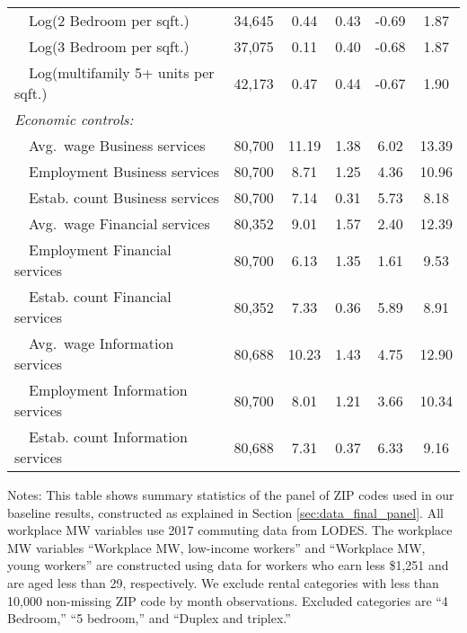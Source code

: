 \begin{table}[hbt!]
\begin{tabular}{@{}lccccc@{}}
        $\quad$Log(2 Bedroom per sqft.)               & 34,645  & 0.44  & 0.43  & -0.69  & 1.87  \\
        $\quad$Log(3 Bedroom per sqft.)               & 37,075  & 0.11  & 0.40  & -0.68  & 1.87  \\
        $\quad$Log(multifamily 5+ units per sqft.)    & 42,173  & 0.47  & 0.44  & -0.67  & 1.90  \\[.3em]
        \textit{Economic controls:}                   &       &       &       &       &       \\
        $\quad$Avg.\ wage Business services           & 80,700  & 11.19  & 1.38  & 6.02  & 13.39  \\
        $\quad$Employment Business services           & 80,700  & 8.71  & 1.25  & 4.36  & 10.96  \\
        $\quad$Estab. count Business services         & 80,700  & 7.14  & 0.31  & 5.73  & 8.18  \\
        $\quad$Avg.\ wage Financial services          & 80,352  & 9.01  & 1.57  & 2.40  & 12.39  \\
        $\quad$Employment Financial services          & 80,700  & 6.13  & 1.35  & 1.61  & 9.53  \\
        $\quad$Estab. count Financial services        & 80,352  & 7.33  & 0.36  & 5.89  & 8.91  \\
        $\quad$Avg.\ wage Information services        & 80,688  & 10.23  & 1.43  & 4.75  & 12.90  \\
        $\quad$Employment Information services        & 80,700  & 8.01  & 1.21  & 3.66  & 10.34  \\
        $\quad$Estab. count Information services      & 80,688  & 7.31  & 0.37  & 6.33  & 9.16  \\ \bottomrule
    \end{tabular}

    \begin{minipage}{.95\textwidth} \footnotesize
        \vspace{2mm}
        Notes: This table shows summary statistics of the panel of ZIP codes 
        used in our baseline results, constructed as explained in Section 
        \ref{sec:data_final_panel}.
        All workplace MW variables use 2017 commuting data from LODES.
        The workplace MW variables ``Workplace MW, low-income workers'' and 
        ``Workplace MW, young workers'' are constructed using data for 
        workers who earn less \$1,251 and are aged less than 29, respectively.
        We exclude rental categories with less than 10,000 non-missing ZIP code 
        by month observations.
        Excluded categories are ``4 Bedroom,'' ``5 bedroom,'' and 
        ``Duplex and triplex.''
    \end{minipage}
\end{table}
